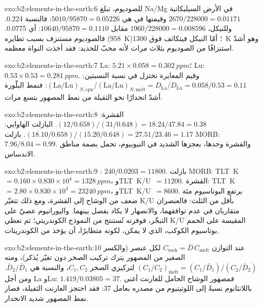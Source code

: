 \begin{solution}{exo:b2:elements-in-the-earth:6}
للصوديوم، تبلغ Na/Mg في الأرض السيليكاتية $2670/\num{228000} = 0.01171$ وقيمتها في  هي
$5010/\num{95870} = 0.05226$: فالنسبة 0.224. وللنيكل، $1960/\num{228000}
= 0.008596$ مقابل $\num{10640}/\num{95870} = 0.1110$: أي 0.0775. فالصوديوم
مستنزف بسبب تطايره (\qty{958}{K})؛ أمّا النيكل فيتكاثف فوق \qty{1300}{K} وهو
أشدّ استنزافًا من الصوديوم بثلاث مرات لأنه محبّ للحديد: فقد أخذت النواة معظمه.
\end{solution}

\begin{solution}{exo:b2:elements-in-the-earth:7}
La: $5.21\times0.058 = \qty{0.302}{ppm}$؛ Lu: $0.53\times0.53 = \qty{0.281}{ppm}$.
وقيم المعايرة تختزل في نسبة النسبتين:
$(\mathrm{La}/\mathrm{Lu})_{N,\mathrm{cpx}}/(\mathrm{La}/\mathrm{Lu})_{N,\mathrm{melt}} =
D_{\mathrm{La}}/D_{\mathrm{Lu}} = 0.058/0.53 = 0.11$: فنمط البلّورة أشدّ انحدارًا نحو
 الثقيلة من نمط المصهور بتسع مرات.
\end{solution}

\begin{solution}{exo:b2:elements-in-the-earth:8}
القشرة: $(12/0.658)/(31/0.648) = 18.24/47.84 = 0.38$. البازلت الهاوايي:
$(18.10/0.658)/(15.20/0.648) = 27.51/23.46 = 1.17$. بازلت MORB: $7.96/8.04 = 0.99$. والقشرة
وحدها، بعجزها الشديد في النيوبيوم، تحمل بصمة مناطق الاندساس.
\end{solution}

\begin{solution}{exo:b2:elements-in-the-earth:9}
: $240/0.0203 = \num{11800}$. بازلت MORB: \mbox{\textdir TLT K $= 0.160\times0.830\times10^4 =
\qty{1328}{ppm}$}، و\mbox{\textdir TLT K/U $= \num{11200}$}. القشرة: \mbox{\textdir TLT K $= 2.80\times0.830\times10^4 =
\qty{23240}{ppm}$}، و\mbox{\textdir TLT K/U $= \num{8600}$}. يرتفع البوتاسيوم مئة ضعف من الوشاح إلى القشرة،
ومع ذلك تتغيّر K/U بأقل من الثلث: فالعنصران متقاربان في عدم توافقهما،
والانصهار لا يكاد يفصل بينهما. واليورانيوم عصيّ على التبخّر، فوفرته تُستنتج من
النموذج الكوندريتي؛ ثم تعطي K/U المقيسة على الحمم بوتاسيوم الكوكب، الذي لا يمكن،
لكونه متطايرًا، أن يؤخذ من الكوندريتات.
\end{solution}

\begin{solution}{exo:b2:elements-in-the-earth:10}
عند التوازن $C_{\mathrm{rock}} = \bar D\,C_{\mathrm{melt}}$ لكل عنصر (والكسر
الصغير من المصهور يترك تركيب الصخر دون تغيّر يُذكر)، ومنه
$(C_1/C_2)_{\mathrm{melt}} = (C_{1}/\bar D_1)/(C_{2}/\bar D_2)$ لتركيزي الصخر $C_1,
C_2$، والنسبة هي $\bar D_2/\bar D_1$. ومن أجل La وLu: $1.419/0.03805 = 37$. فمصهور
الوشاح الحامل للغارنت أغنى باللانثانوم نسبةً إلى اللوتيتيوم من مصدره بعامل 37: فقد
احتجز الغارنت  الثقيلة، فصار نمط المصهور شديد الانحدار.
\end{solution}

